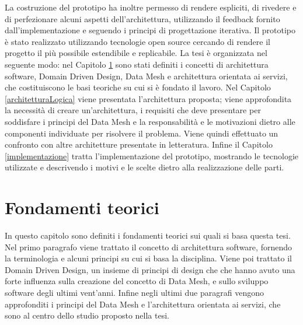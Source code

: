 \documentclass[12pt]{report}
\begin{document}
La costruzione del prototipo ha inoltre permesso di rendere espliciti, di rivedere e di perfezionare alcuni aspetti dell'architettura, utilizzando il feedback fornito dall'implementazione e seguendo i principi di progettazione iterativa.
Il prototipo è stato realizzato utilizzando tecnologie open source cercando di rendere il progetto il più possibile estendibile e replicabile.
La tesi è organizzata nel seguente modo: nel Capitolo \ref{fondamenti teorici} sono stati definiti i concetti di architettura software, Domain Driven Design, Data Mesh e architettura orientata ai servizi, che costituiscono le basi teoriche su cui si è fondato il lavoro.
Nel Capitolo \ref{architetturaLogica} viene presentata l'architettura proposta; viene approfondita la necessità di creare un'architettura, i requisiti che deve presentare per soddisfare i principi del Data Mesh e la responsabilità e le motivazioni dietro alle componenti individuate per risolvere il problema.
Viene quindi effettuato un confronto con altre architetture presentate in letteratura.
Infine il Capitolo \ref{implementazione} tratta l'implementazione del prototipo,  mostrando le tecnologie utilizzate e descrivendo i motivi e le scelte dietro alla realizzazione delle parti.

\chapter{Fondamenti teorici}\label{fondamenti teorici}
In questo capitolo sono definiti i fondamenti teorici sui quali si basa questa tesi.
Nel primo paragrafo viene trattato il concetto di architettura software, fornendo la terminologia e alcuni principi su cui si basa la disciplina.
Viene poi trattato il Domain Driven Design, un insieme di principi di design che che hanno avuto una forte influenza sulla creazione del concetto di Data Mesh, e sullo sviluppo software degli ultimi vent'anni.
Infine negli ultimi due paragrafi vengono approfonditi i principi del Data Mesh e l'architettura orientata ai servizi, che sono al centro dello studio proposto nella tesi.
\end{document}
